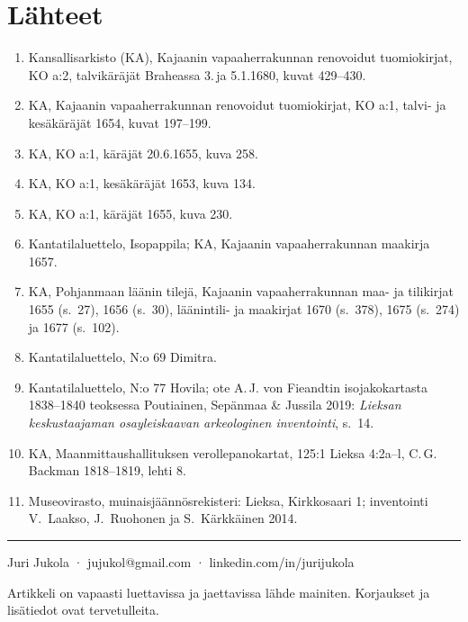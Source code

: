 \documentclass[11pt,a4paper]{article}
\begin{document}
\section{Lähteet}

{\footnotesize
\begin{enumerate}[label=\arabic*,leftmargin=1.6em,itemsep=0.02em,topsep=0.1em]
\item Kansallisarkisto (KA), Kajaanin vapaaherrakunnan renovoidut tuomiokirjat, KO a:2, talvikäräjät Braheassa 3.\,ja 5.1.1680, kuvat 429–430.
\item KA, Kajaanin vapaaherrakunnan renovoidut tuomiokirjat, KO a:1, talvi- ja kesäkäräjät 1654, kuvat 197–199.
\item KA, KO a:1, käräjät 20.6.1655, kuva 258.
\item KA, KO a:1, kesäkäräjät 1653, kuva 134.
\item KA, KO a:1, käräjät 1655, kuva 230.
\item Kantatilaluettelo, Isopappila; KA, Kajaanin vapaaherrakunnan maakirja 1657.
\item KA, Pohjanmaan läänin tilejä, Kajaanin vapaaherrakunnan maa- ja tilikirjat 1655 (s.~27), 1656 (s.~30), läänintili- ja maakirjat 1670 (s.~378), 1675 (s.~274) ja 1677 (s.~102).
\item Kantatilaluettelo, N:o 69 Dimitra.
\item Kantatilaluettelo, N:o 77 Hovila; ote A.\,J. von Fieandtin isojakokartasta 1838–1840 teoksessa Poutiainen, Sepänmaa \& Jussila 2019: \emph{Lieksan keskustaajaman osayleiskaavan arkeologinen inventointi}, s.~14.
\item KA, Maanmittaushallituksen verollepanokartat, 125:1 Lieksa 4:2a–l, C.\,G. Backman 1818–1819, lehti 8.
\item Museovirasto, muinaisjäännösrekisteri: Lieksa, Kirkkosaari 1; inventointi V.~Laakso, J.~Ruohonen ja S.~Kärkkäinen 2014.
\end{enumerate}

\vspace{0.4em}
{\color{leima}\rule{\linewidth}{0.4pt}}\par
{\sffamily Juri Jukola · jujukol@gmail.com · linkedin.com/in/jurijukola}\par
Artikkeli on vapaasti luettavissa ja jaettavissa lähde mainiten. Korjaukset ja lisätiedot ovat tervetulleita.\par
}
\end{document}

